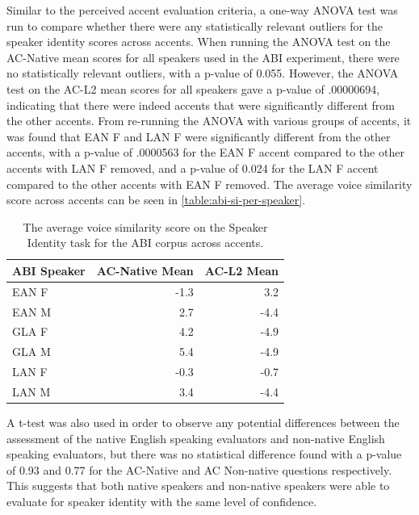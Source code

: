 \documentclass
[
    a4paper,
    twoside,
    12pt,
]
{report}
\begin{document}
Similar to the perceived accent evaluation criteria, a one-way ANOVA
test was run to compare whether there were any statistically relevant
outliers for the speaker identity scores across accents. When running
the ANOVA test on the AC-Native mean scores for all speakers used in the
ABI experiment, there were no statistically relevant outliers, with a
p-value of 0.055. However, the ANOVA test on the AC-L2 mean scores for
all speakers gave a p-value of .00000694, indicating that there were
indeed accents that were significantly different from the other accents.
From re-running the ANOVA with various groups of accents, it was found
that EAN F and LAN F were significantly different from the other
accents, with a p-value of .0000563 for the EAN F accent compared to the
other accents with LAN F removed, and a p-value of 0.024 for the LAN F
accent compared to the other accents with EAN F removed. The average
voice similarity score across accents can be seen in
\autoref{table:abi-si-per-speaker}.

\begin{table}[]
\centering
\begin{tabular}{|l|r|r|}
\hline
\textbf{ABI Speaker} & \textbf{AC-Native Mean} & \multicolumn{1}{l|}{\textbf{AC-L2 Mean}} \\ \hline
EAN F                & -1.3                    & 3.2                                      \\ \hline
EAN M                & 2.7                     & -4.4                                     \\ \hline
GLA F                & 4.2                     & -4.9                                     \\ \hline
GLA M                & 5.4                     & -4.9                                     \\ \hline
LAN F                & -0.3                    & -0.7                                     \\ \hline
LAN M                & 3.4                     & -4.4                                     \\ \hline
\end{tabular}
\caption{The average voice similarity score on the Speaker Identity task for the ABI corpus across accents.}
\label{table:abi-si-per-speaker}
\end{table}

A t-test was also used in order to observe any potential differences
between the assessment of the native English speaking evaluators and
non-native English speaking evaluators, but there was no statistical
difference found with a p-value of 0.93 and 0.77 for the AC-Native and
AC Non-native questions respectively. This suggests that both native
speakers and non-native speakers were able to evaluate for speaker
identity with the same level of confidence.
\end{document}
